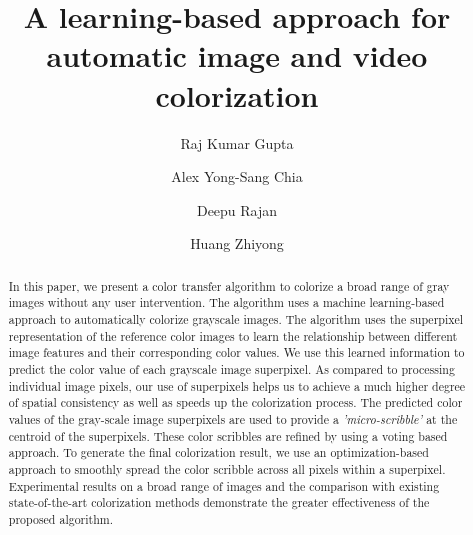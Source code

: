 \documentclass[twocolumn]{svjour3}          %
\begin{document}

\title{A learning-based approach for automatic image and video colorization}
\subtitle{}

\author{Raj Kumar Gupta \and Alex Yong-Sang Chia \and Deepu Rajan \and Huang Zhiyong}
\date{ }%

\maketitle


\begin{abstract}
In this paper, we present a color transfer algorithm to colorize a broad range of gray images without any user intervention. The algorithm uses a machine learning-based approach to automatically colorize grayscale images. The algorithm uses the superpixel representation of the reference color images to learn the relationship between different image features and their corresponding color values. We use this learned information to predict the color value of each grayscale image superpixel. As compared to processing individual image pixels, our use of superpixels helps us to achieve a much higher degree of spatial consistency as well as speeds up the colorization process. The predicted color values of the gray-scale image superpixels are used to provide a \emph{'micro-scribble'} at the centroid of the superpixels. These color scribbles are refined by using a voting based approach. To generate the final colorization result, we use an optimization-based approach to smoothly spread the color scribble across all pixels within a superpixel. Experimental results on a broad range of images and the comparison with existing state-of-the-art colorization methods demonstrate the greater effectiveness of the proposed algorithm.
 
\end{abstract}
\end{document}

